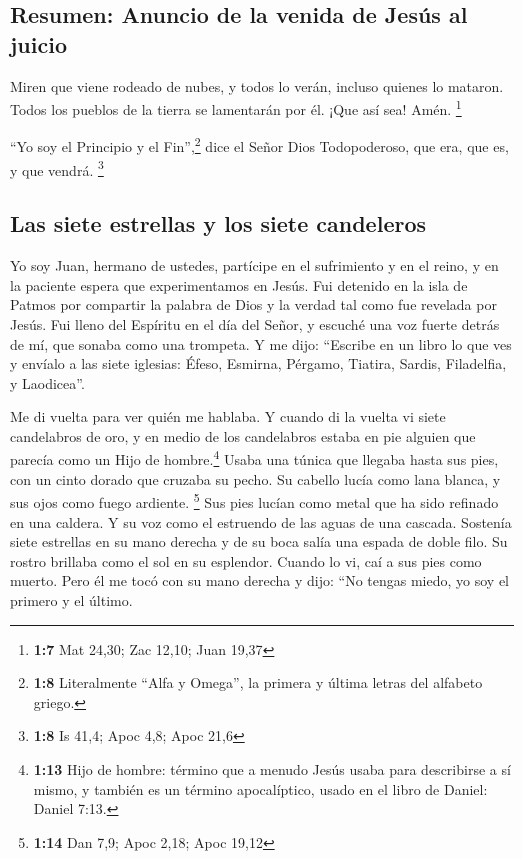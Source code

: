 \hypertarget{resumen-anuncio-de-la-venida-de-jesuxfas-al-juicio}{%
\subsection{Resumen: Anuncio de la venida de Jesús al
juicio}\label{resumen-anuncio-de-la-venida-de-jesuxfas-al-juicio}}

 Miren que viene rodeado de nubes, y todos lo verán,
incluso quienes lo mataron. Todos los pueblos de la tierra se lamentarán
por él. ¡Que así sea! Amén. \footnote{\textbf{1:7} Mat 24,30; Zac 12,10;
  Juan 19,37}

 ``Yo soy el Principio y el Fin'',\footnote{\textbf{1:8}
  Literalmente ``Alfa y Omega'', la primera y última letras del alfabeto
  griego.} dice el Señor Dios Todopoderoso, que era, que es, y que
vendrá. \footnote{\textbf{1:8} Is 41,4; Apoc 4,8; Apoc 21,6}

\hypertarget{las-siete-estrellas-y-los-siete-candeleros}{%
\subsection{Las siete estrellas y los siete
candeleros}\label{las-siete-estrellas-y-los-siete-candeleros}}

 Yo soy Juan, hermano de ustedes, partícipe en el
sufrimiento y en el reino, y en la paciente espera que experimentamos en
Jesús. Fui detenido en la isla de Patmos por compartir la palabra de
Dios y la verdad tal como fue revelada por Jesús.  Fui
lleno del Espíritu en el día del Señor, y escuché una voz fuerte detrás
de mí, que sonaba como una trompeta.  Y me dijo:
``Escribe en un libro lo que ves y envíalo a las siete iglesias: Éfeso,
Esmirna, Pérgamo, Tiatira, Sardis, Filadelfia, y Laodicea''.

 Me di vuelta para ver quién me hablaba. Y cuando di la
vuelta vi siete candelabros de oro,  y en medio de los
candelabros estaba en pie alguien que parecía como un Hijo de
hombre.\footnote{\textbf{1:13} Hijo de hombre: término que a menudo
  Jesús usaba para describirse a sí mismo, y también es un término
  apocalíptico, usado en el libro de Daniel: Daniel 7:13.} Usaba una
túnica que llegaba hasta sus pies, con un cinto dorado que cruzaba su
pecho.  Su cabello lucía como lana blanca, y sus ojos
como fuego ardiente. \footnote{\textbf{1:14} Dan 7,9; Apoc 2,18; Apoc
  19,12}  Sus pies lucían como metal que ha sido refinado
en una caldera. Y su voz como el estruendo de las aguas de una cascada.
 Sostenía siete estrellas en su mano derecha y de su boca
salía una espada de doble filo. Su rostro brillaba como el sol en su
esplendor.  Cuando lo vi, caí a sus pies como muerto.
Pero él me tocó con su mano derecha y dijo: ``No tengas miedo, yo soy el
primero y el último.

